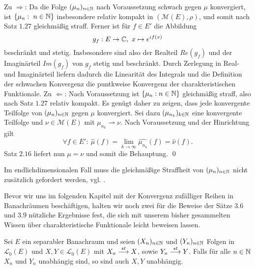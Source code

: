 \begin{proof*}
    Zu $\Rightarrow$: Da die Folge $(\mu_n)_{n \in \mathbb{N}}$ nach Voraussetzung schwach gegen $\mu$ konvergiert, 
    ist $\{\mu_n : \ n \in  \mathbb{N}\}$ insbesondere relativ kompakt in $(\mathcal{M}(E), \rho)$, und somit nach Satz $1.27$ gleichmäßig straff. 
    Ferner ist für $f \in E'$ die Abbildung 
    $$
        g_f: E \to \mathbb{C},  \ x \mapsto e^{if(x)}
    $$ 
    beschränkt und stetig. Insbesondere sind also der Realteil $Re(g_f)$ und der Imaginärteil $Im(g_f)$ von $g_f$ stetig und beschränkt. 
    Durch Zerlegung in Real- und Imaginärteil liefern dadurch die Linearität des Integrals und die Definition der schwachen Konvergenz die puntkweise Konvergenz der charakteristischen Funktionale. 
    \newline 
    Zu $\Leftarrow$: Nach Voraussetzung ist  $\{\mu_n : n \in \mathbb{N}\}$ gleichmäßig straff, also nach Satz $1.27$ relativ kompakt. Es genügt daher zu zeigen, dass jede konvergente Teilfolge von $(\mu_n)_{n \in \mathbb{N}}$ gegen $\mu$ konvergiert. 
    Sei dazu $(\mu_{n_k})_{k \in \mathbb{N}}$ eine konvergente Teilfolge und $\nu \in \mathcal{M}(E)$ mit $\mu_{n_k} \rightharpoonup \nu$. Nach Voraussetzung und der Hinrichtung gilt 
    $$
        \forall f \in E': \ \widehat{\mu}(f) = \lim_{k \to \infty} \widehat{\mu_{n_k}}(f) = \widehat{\nu}(f).
    $$
    Satz $2.16$ liefert nun $\mu = \nu$ und somit die Behauptung. \qed
\end{proof*}

\begin{remark}
    Im endlichdimensionalen Fall muss die gleichmäßige Straffheit von $(\mu_n)_{n \in \mathbb{N}}$ nicht zusätzlich gefordert werden, vgl. \cite[Satz 8.7.5]{gs}. 
\end{remark}

Bevor wir uns im folgenden Kapitel mit der Konvergenz zufälliger Reihen in Banachräumen beschäftigen, halten wir noch zwei für die Beweise der Sätze $3.6$ und $3.9$ nützliche Ergebnisse fest, die sich mit unserem bisher gesammelten Wissen über charakteristische Funktionale leicht beweisen lassen.  

\begin{proposition}
    Sei $E$ ein separabler Banachraum und seien $(X_n)_{n \in \mathbb{N}}$ und $(Y_n)_{n \in \mathbb{N}}$ Folgen in $\mathcal{L}_0(E)$ und \mbox{$X,Y \in \mathcal{L}_0(E)$} mit $X_n \overset{st}{\longrightarrow} X$, sowie $Y_n \overset{st}{\longrightarrow} Y$. 
    Falls für alle $n \in \mathbb{N}$ $X_n$ und $Y_n$ unabhängig sind, so sind auch $X,Y$ unabhängig. 
\end{proposition}

